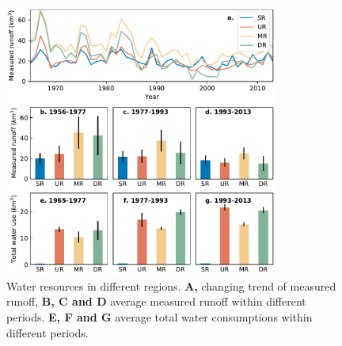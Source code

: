 \documentclass[9pt,twoside,lineno]{pnas-new}
\begin{document}
\begin{figure}
    \centering
    \includegraphics[width=0.8\textwidth]{../../figures/sup/sf_measured_runoff.pdf}
    \caption{Water resources in different regions. 
        \textbf{A,} changing trend of measured runoff, 
        \textbf{B, C and D} average measured runoff within different periods.
        \textbf{E, F and G} average total water consumptions within different periods. 
    }
\end{figure}
\end{document}
